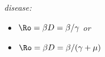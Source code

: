 
\textsl{disease:}
\begin{itemize}
\item $\Ro = \beta D = \beta/\gamma$ \emph{or}
\item $\Ro = \beta D = \beta/(\gamma+\mu)$ 
\end{itemize}

